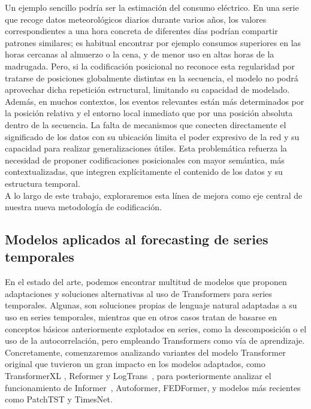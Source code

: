 Un ejemplo sencillo podría ser la estimación del consumo eléctrico. En una serie que recoge datos meteorológicos diarios durante varios años, los valores correspondientes a una hora concreta de diferentes días podrían compartir patrones similares; es habitual encontrar por ejemplo consumos superiores en las horas cercanas al almuerzo o la cena, y de menor uso en altas horas de la madrugada. Pero, si la codificación posicional no reconoce esta regularidad por tratarse de posiciones globalmente distintas en la secuencia, el modelo no podrá aprovechar dicha repetición estructural, limitando su capacidad de modelado.\\

Además, en muchos contextos, los eventos relevantes están más determinados por la posición relativa y el entorno local inmediato que por una posición absoluta dentro de la secuencia. La falta de mecanismos que conecten directamente el significado de los datos con su ubicación limita el poder expresivo de la red y su capacidad para realizar generalizaciones útiles. Esta problemática refuerza la necesidad de proponer codificaciones posicionales con mayor semántica, más contextualizadas, que integren explícitamente el contenido de los datos y su estructura temporal.\\

A lo largo de este trabajo, exploraremos esta línea de mejora como eje central de nuestra nueva metodología de codificación.


\subsection{Modelos aplicados al forecasting de series temporales}

En el estado del arte, podemos encontrar multitud de modelos que proponen adaptaciones y soluciones alternativas al uso de Transformers para series temporales. Algunas, son soluciones propias de lenguaje natural adaptadas a su uso en series temporales, mientras que en otros casos tratan de basarse en conceptos básicos anteriormente explotados en series, como la descomposición o el uso de la autocorrelación, pero empleando Transformers como vía de aprendizaje.\\

Concretamente, comenzaremos analizando variantes del modelo Transformer original que tuvieron un gran impacto en los modelos adaptados, como TransformerXL \cite{dai2019transformerxlattentivelanguagemodels}, Reformer \cite{kitaev2020reformerefficienttransformer} y LogTrans~\cite{NEURIPS2019_6775a063}, para posteriormente analizar el funcionamiento de Informer~\cite{zhou2021informerefficienttransformerlong}, Autoformer, FEDFormer, y modelos más recientes como PatchTST y TimesNet.

